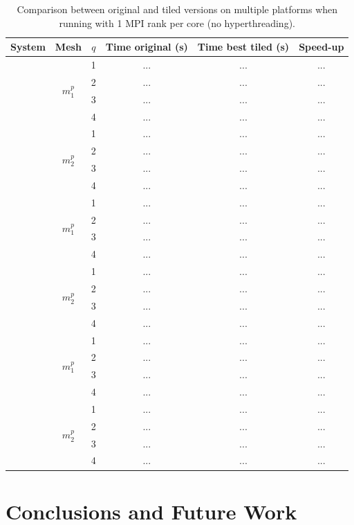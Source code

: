 \begin{table}[htpb]
\centering
\begin{tabulary}{1.0\columnwidth}{c || c | c || c | c || c}
\hline
System & Mesh & $q$ & Time original (s) & Time best tiled (s) & Speed-up  \\ 
\hline \hline 
{} &  & 1 & ... & ... & ... \\ 
 & & 2 & ... & ... & ... \\ 
 & & 3 & ... & ... & ... \\
 & & 4 & ... & ... & ... \\
 &  & 1 & ... & ... & ... \\ 
 & & 2 & ... & ... & ... \\ 
 & & 3 & ... & ... & ... \\
 & & 4 & ... & ... & ... \\ 
\hline \hline
{} &  & 1 & ... & ... & ... \\ 
 & & 2 & ... & ... & ... \\ 
 & & 3 & ... & ... & ... \\
 & & 4 & ... & ... & ... \\
 &  & 1 & ... & ... & ... \\ 
 & & 2 & ... & ... & ... \\ 
 & & 3 & ... & ... & ... \\
 & & 4 & ... & ... & ... \\ 
\hline \hline
{} &  & 1 & ... & ... & ... \\ 
 & & 2 & ... & ... & ... \\ 
 & & 3 & ... & ... & ... \\
 & & 4 & ... & ... & ... \\
 &  & 1 & ... & ... & ... \\ 
 & & 2 & ... & ... & ... \\ 
 & & 3 & ... & ... & ... \\
 & & 4 & ... & ... & ... \\ 
\hline
\end{tabulary}
\caption{Comparison between original and tiled versions on multiple platforms when running with 1 MPI rank per core (no hyperthreading).}
\label{table:seigen-speedups}
\end{table}

\section{Conclusions and Future Work}
